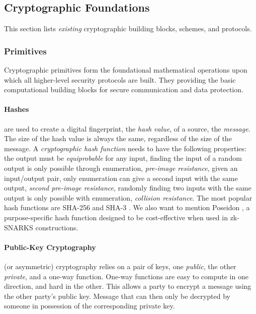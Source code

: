 \subsection{Cryptographic Foundations}
\label{subsub:cryptography}

This section lists \emph{existing} cryptographic building blocks, schemes, and protocols.


\subsubsection{Primitives} 

Cryptographic primitives form the foundational mathematical operations upon which all higher-level security protocols are built.
They providing the basic computational building blocks for secure communication and data protection.

\paragraph{Hashes} are used to create a digital fingerprint, the \emph{hash value}, of a source, the \emph{message}.
The size of the hash value is always the same, regardless of the size of the message.
A \emph{cryptographic hash function} needs to have the following properties:
the output must be \emph{equiprobable} for any input, finding the input of a random output is only possible through enumeration, \emph{pre-image resistance}, given an input/output pair, only enumeration can give a second input with the same output, \emph{second pre-image resistance}, randomly finding two inputs with the same output is only possible with enumeration, \emph{collision resistance}.
The most popular hash functions are SHA-256 \cite{FIPS180-4} and SHA-3 \cite{FIPS202}.
We also want to mention Poseidon \cite{GKRRS21}, a purpose-specific hash function designed to be cost-effective when used in zk-SNARKS constructions.

\paragraph{Public-Key Cryptography} 
\label{sp:public-key-cryptography}
(or asymmetric) cryptography relies on a pair of keys, one \emph{public}, the other \emph{private}, and a one-way function. 
One-way functions are easy to compute in one direction, and hard in the other. 
This allows a party to encrypt a message using the other party's public key. 
Message that can then only be decrypted by someone in possession of the corresponding private key.


